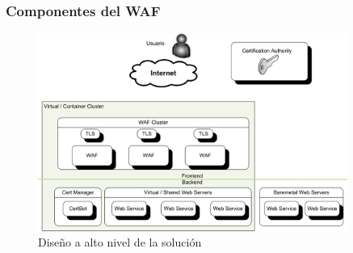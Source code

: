 \begin{frame}[shrink]
  \frametitle{Componentes del WAF}
  \begin{figure}
    \includegraphics[width=0.9\textwidth]{fig/Diagram_HLD}
    \caption{\small{Diseño a alto nivel de la solución}}
  \end{figure}
\end{frame}

